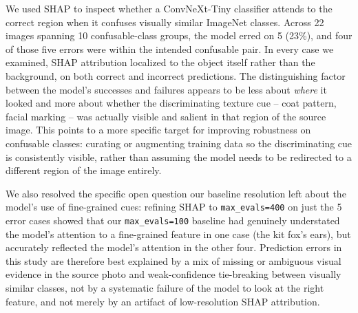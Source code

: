 We used SHAP to inspect whether a ConvNeXt-Tiny classifier attends to the
correct region when it confuses visually similar ImageNet classes. Across
22 images spanning 10 confusable-class groups, the model erred on 5 (23\%),
and four of those five errors were within the intended confusable pair.
In every case we examined, SHAP attribution localized to the object itself
rather than the background, on both correct and incorrect predictions. The
distinguishing factor between the model's successes and failures appears to
be less about \emph{where} it looked and more about whether the
discriminating texture cue -- coat pattern, facial marking -- was actually
visible and salient in that region of the source image. This points to a
more specific target for improving robustness on confusable classes:
curating or augmenting training data so the discriminating cue is
consistently visible, rather than assuming the model needs to be redirected
to a different region of the image entirely.

We also resolved the specific open question our baseline resolution left
about the model's use of fine-grained cues: refining SHAP to
\texttt{max\_evals=400} on just the 5 error cases showed that our
\texttt{max\_evals=100} baseline had genuinely understated the model's
attention to a fine-grained feature in one case (the kit fox's ears), but
accurately reflected the model's attention in the other four. Prediction
errors in this study are therefore best explained by a mix of missing or
ambiguous visual evidence in the source photo and weak-confidence
tie-breaking between visually similar classes, not by a systematic failure
of the model to look at the right feature, and not merely by an artifact of
low-resolution SHAP attribution.
